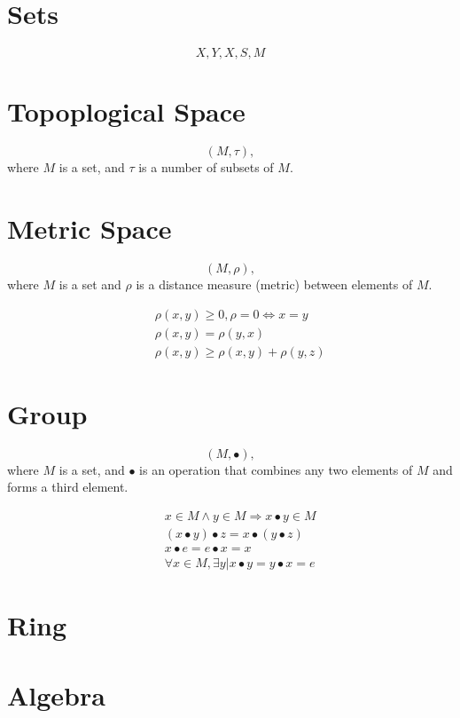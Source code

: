 \documentclass[a4paper]{report}
\begin{document}
\section{Sets} 
$$
   X,Y,X,S,M
$$

\section{Topoplogical Space} 

$$
  (M, \tau),
$$
where $M$ is a set, and $\tau$ is a number of 
subsets of $M$.

\section{Metric Space} 
$$
   (M,\rho),
$$
where $M$ is a set and $\rho$ is a distance measure (metric)
between elements of $M$.

\begin{eqnarray}
 &&   \rho(x,y) \ge 0, \rho=0 \Leftrightarrow x=y \\
 &&   \rho(x,y) = \rho(y,x) \\
 &&   \rho(x,y) \ge \rho(x,y) + \rho(y,z)
\end{eqnarray}

\section{Group}
$$
  (M,\bullet),
$$
where $M$ is a set, and $\bullet$ is an operation that combines any
two elements of $M$ and forms a third element.

\begin{eqnarray}
   &&  x \in M \land y \in M \Rightarrow x\bullet y \in M \\
   &&  (x\bullet y) \bullet z = x \bullet (y \bullet z) \\
   &&  x\bullet e = e\bullet x = x \\
   &&  \forall x \in M,  \exists y | x\bullet y = y\bullet x = e 
\end{eqnarray}
 

\section{Ring}

\section{Algebra}
\end{document}
